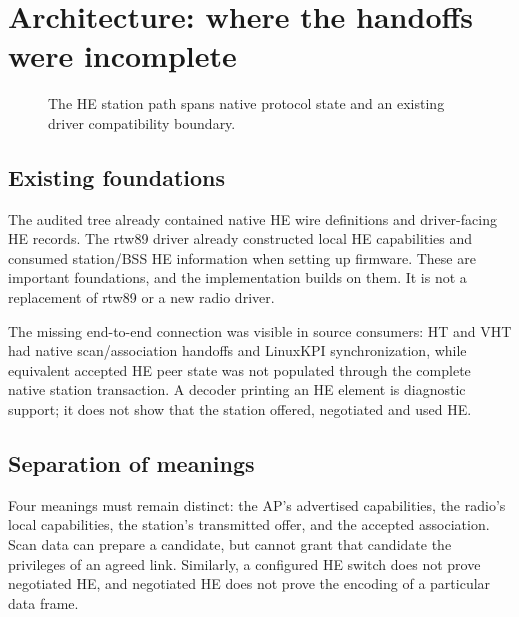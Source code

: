 \documentclass[11pt,letterpaper,oneside]{article}
\begin{document}
\section{Architecture: where the handoffs were incomplete}
\begin{figure}[H]\centering
{}\caption{The HE station path spans native protocol state and an existing driver compatibility boundary.}\end{figure}
\subsection{Existing foundations}
The audited tree already contained native HE wire definitions and driver-facing HE records. The rtw89 driver already constructed local HE capabilities and consumed station/BSS HE information when setting up firmware. These are important foundations, and the implementation builds on them. It is not a replacement of rtw89 or a new radio driver.

The missing end-to-end connection was visible in source consumers: HT and VHT had native scan/association handoffs and LinuxKPI synchronization, while equivalent accepted HE peer state was not populated through the complete native station transaction. A decoder printing an HE element is diagnostic support; it does not show that the station offered, negotiated and used HE.

\subsection{Separation of meanings}
Four meanings must remain distinct: the AP's advertised capabilities, the radio's local capabilities, the station's transmitted offer, and the accepted association. Scan data can prepare a candidate, but cannot grant that candidate the privileges of an agreed link. Similarly, a configured HE switch does not prove negotiated HE, and negotiated HE does not prove the encoding of a particular data frame.
\end{document}
